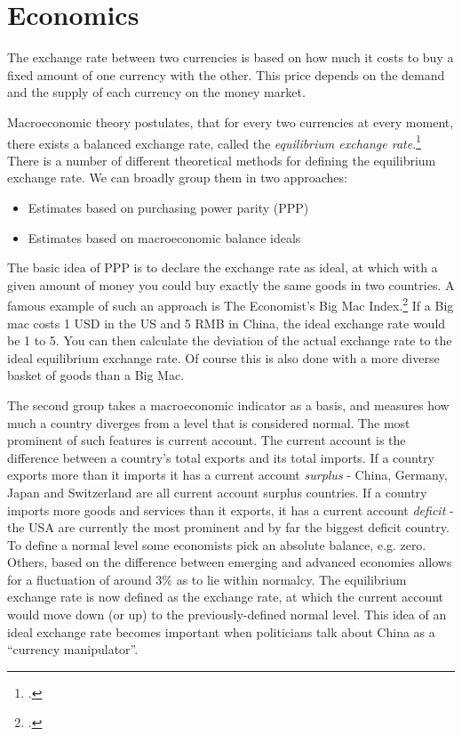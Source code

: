 \section{Economics}
\label{sec:economics}

The exchange rate between two currencies is based on how much it 
costs to buy a fixed amount of one currency with the other. This price 
depends on the demand and the supply of each currency on the money market. 

Macroeconomic theory postulates, that for every two currencies at every 
moment, there exists a balanced exchange rate, called the 
\emph{equilibrium exchange rate}.\footnote{\cite[pp. 
505]{Krugman2008}.} There is a number of different theoretical methods 
for defining the equilibrium exchange rate. We can broadly group them in 
two approaches: 

\begin{itemize}
\item{Estimates based on purchasing power parity (PPP)}
\item{Estimates based on macroeconomic balance ideals}
\end{itemize}

The basic idea of PPP is to declare the exchange rate as ideal, at which 
with a given amount of money you could buy exactly the same goods in two 
countries. A famous example of such an approach is The Economist's Big 
Mac Index.\footnote{\cite{Economist2012}.} 
If a Big mac costs 1 USD in the US and 5 RMB in China, the ideal 
exchange rate would be 1 to 5. You can then calculate the deviation of 
the actual exchange rate to the ideal equilibrium exchange rate. Of 
course this is also done with a more diverse basket of goods than a Big 
Mac. 

The second group takes a macroeconomic indicator as a basis, and 
measures how much a country diverges from a level that is considered 
normal. The most prominent of such features is current account. The 
current account is the difference between a country's total exports and 
its total imports. If a country exports more than it imports it has a 
current account \emph{surplus} - China, Germany, Japan and Switzerland 
are all current account surplus countries. If a country imports more 
goods and services than it exports, it has a current account 
\emph{deficit} - the USA are currently the most prominent and by far the 
biggest deficit country. To define a normal level some economists pick 
an absolute balance, e.g. zero. Others, based on the difference between 
emerging and advanced economies allows for a fluctuation of around 3\% 
as to lie within normalcy. The equilibrium exchange rate is now defined 
as the exchange rate, at which the current account would move down (or 
up) to the previously-defined normal level. This idea of an ideal 
exchange rate becomes important when politicians talk about China as a 
``currency manipulator''.

